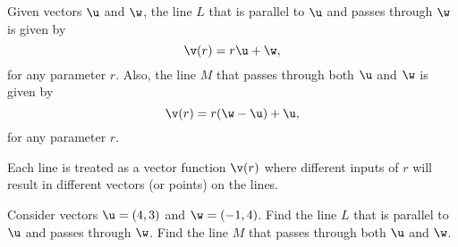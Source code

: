 Given vectors $\u$ and $\w$, the line $L$ that is parallel to $\u$ and passes
through $\w$ is given by
\[%
  \v(r) = r\u + \w
,\]%
for any parameter $r$. Also, the line $M$ that passes through both $\u$ and
$\w$ is given by
\[%
  \v(r) = r(\w - \u) + \u
,\]%
for any parameter $r$.

\begin{note}
  \label{nte:each_line_treated_as_a_vector_function}

  Each line is treated as a vector function $\v(r)$ where different inputs of
  $r$ will result in different vectors (or points) on the lines.
\end{note}

\begin{question}
  \label{qst:parallel_and_passes_through_line_with_vectors}

  Consider vectors $\u = (4, 3)$ and $\w = (-1, 4)$. Find the line $L$ that is
  parallel to $\u$ and passes through $\w$. Find the line $M$ that passes
  through both $\u$ and $\w$.
\end{question}

